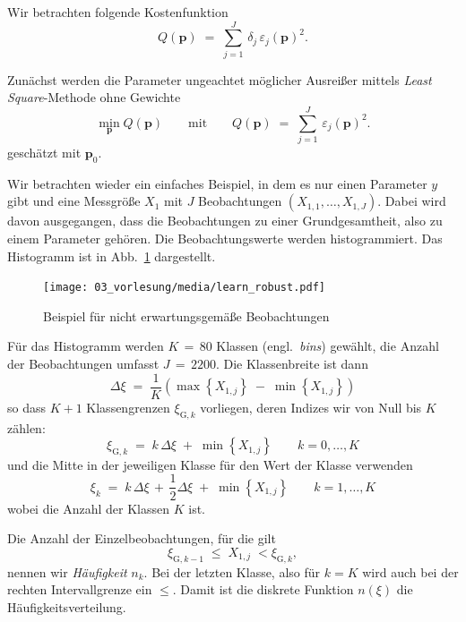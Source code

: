 Wir betrachten folgende Kostenfunktion
\begin{equation}
Q(\mathbf{p}) \; = \; \sum_{j=1}^J \, \delta_j \, \varepsilon_j(\mathbf{p})^2 .
\label{robustEstim}
\end{equation}

Zunächst werden die Parameter ungeachtet möglicher Ausreißer mittels \textsl{Least Square}-Methode
ohne Gewichte
\begin{equation}
 \min_{\mathbf{p}} Q(\mathbf{p}) \qquad \mathrm{mit} \qquad
Q(\mathbf{p}) \; = \; \sum_{j=1}^J \, \varepsilon_j(\mathbf{p})^2 .
\label{linEstim}
\end{equation}
geschätzt mit $\mathbf{p}_0$.

Wir betrachten wieder ein einfaches Beispiel, in dem es nur einen Parameter $y$ gibt und eine
Messgröße $X_1$ mit $J$ Beobachtungen $(X_{1,1},\dots,X_{1,J})$.
Dabei wird davon ausgegangen, dass die Beobachtungen zu einer Grundgesamtheit, also zu einem Parameter gehören.
Die Beobachtungswerte werden histogrammiert. Das Histogramm ist in Abb.~\ref{biasExampleKap3} dargestellt.
\begin{figure}
\begin{center}
\texttt{[image: 03\_vorlesung/media/learn\_robust.pdf]}
\caption{Beispiel für nicht erwartungsgemäße Beobachtungen}
\label{biasExampleKap3}
\end{center}
\end{figure}
Für das Histogramm werden $K \, = \, 80$ Klassen (engl.\ \textsl{bins}) gewählt, die Anzahl der Beobachtungen umfasst $J \, = \, 2200$.
Die Klassenbreite ist dann
\begin{equation}
\Delta \xi \; = \; \frac{1}{K} \left( \max \left\{X_{1,j}\right\} \; - \; \min \left\{X_{1,j}\right\} \right)
\end{equation}
so dass $K+1$ Klassengrenzen $\xi_{\mathrm{G}, k}$ vorliegen,
deren Indizes wir von Null bis $K$ zählen:
\begin{equation}
 \xi_{\mathrm{G}, k} \; = \; k \, \Delta \xi \; + \; \min \left\{X_{1,j}\right\}
\qquad k = 0, \dots, K
\label{limkthbin}
\end{equation}
und die Mitte in der jeweiligen Klasse für den Wert der Klasse verwenden
\begin{equation}
 \xi_k \; = \; k \, \Delta \xi  \, + \, \frac{1}{2} \Delta \xi  \; + \; \min \left\{X_{1,j}\right\}
\qquad k = 1, \dots, K
\label{kthbin}
\end{equation}
wobei die Anzahl der Klassen $K$ ist.

Die Anzahl der Einzelbeobachtungen, für die gilt
\begin{equation}
\xi_{\mathrm{G}, k-1} \; \leq \; X_{1,j} \; <  \xi_{\mathrm{G}, k},
\end{equation}
nennen wir \textsl{Häufigkeit} $n_k$. Bei der letzten Klasse, also für
$k = K$ wird auch bei der rechten Intervallgrenze ein $\leq$.
Damit ist die diskrete Funktion $n(\xi)$ die Häufigkeitsverteilung.


